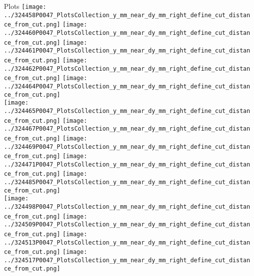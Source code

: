 \documentclass{beamer}
\begin{document}
\begin{frame}\tiny
        \begin{block}{Plots}
		  \centering
                \texttt{[image: ../324458P0047\_PlotsCollection\_y\_mm\_near\_dy\_mm\_right\_define\_cut\_distance\_from\_cut.png]}
                \texttt{[image: ../324460P0047\_PlotsCollection\_y\_mm\_near\_dy\_mm\_right\_define\_cut\_distance\_from\_cut.png]}
                \texttt{[image: ../324461P0047\_PlotsCollection\_y\_mm\_near\_dy\_mm\_right\_define\_cut\_distance\_from\_cut.png]}
                \texttt{[image: ../324462P0047\_PlotsCollection\_y\_mm\_near\_dy\_mm\_right\_define\_cut\_distance\_from\_cut.png]}
                \texttt{[image: ../324464P0047\_PlotsCollection\_y\_mm\_near\_dy\_mm\_right\_define\_cut\_distance\_from\_cut.png]}\\
                \texttt{[image: ../324465P0047\_PlotsCollection\_y\_mm\_near\_dy\_mm\_right\_define\_cut\_distance\_from\_cut.png]}
                \texttt{[image: ../324467P0047\_PlotsCollection\_y\_mm\_near\_dy\_mm\_right\_define\_cut\_distance\_from\_cut.png]}
                \texttt{[image: ../324469P0047\_PlotsCollection\_y\_mm\_near\_dy\_mm\_right\_define\_cut\_distance\_from\_cut.png]}
                \texttt{[image: ../324471P0047\_PlotsCollection\_y\_mm\_near\_dy\_mm\_right\_define\_cut\_distance\_from\_cut.png]}
                \texttt{[image: ../324485P0047\_PlotsCollection\_y\_mm\_near\_dy\_mm\_right\_define\_cut\_distance\_from\_cut.png]}\\
                \texttt{[image: ../324498P0047\_PlotsCollection\_y\_mm\_near\_dy\_mm\_right\_define\_cut\_distance\_from\_cut.png]}
                \texttt{[image: ../324509P0047\_PlotsCollection\_y\_mm\_near\_dy\_mm\_right\_define\_cut\_distance\_from\_cut.png]}
                \texttt{[image: ../324513P0047\_PlotsCollection\_y\_mm\_near\_dy\_mm\_right\_define\_cut\_distance\_from\_cut.png]}
                \texttt{[image: ../324517P0047\_PlotsCollection\_y\_mm\_near\_dy\_mm\_right\_define\_cut\_distance\_from\_cut.png]}

\end{block}
\end{frame}
\end{document}
